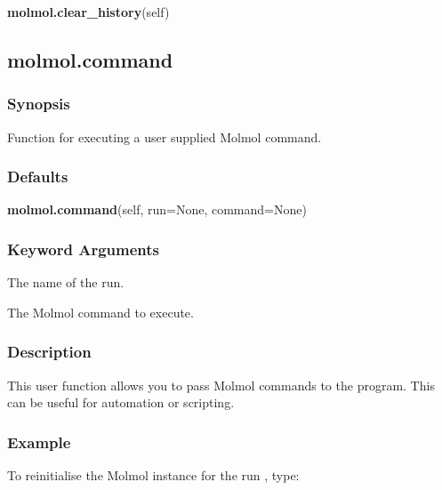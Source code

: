  \textsf{\textbf{molmol.clear\_history}(self)} 

  

 \newpage 

 \subsection{molmol.command} 

  
 \subsubsection{Synopsis} 

 Function for executing a user supplied Molmol command. 
  

  
 \subsubsection{Defaults} 

 \textsf{\textbf{molmol.command}(self, run=None, command=None)} 

  
 \subsubsection{Keyword Arguments} 

   The name of the run.   

   The Molmol command to execute.  

  

  
 \subsubsection{Description} 

 This user function allows you to pass Molmol commands to the program.  This can be useful for automation or scripting. 
  

  
 \subsubsection{Example} 

 To reinitialise the Molmol instance for the run , type: 
  

